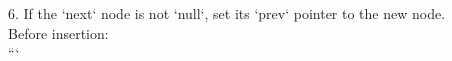 \documentclass[preview]{standalone}
\begin{document}
6. If the `next` node is not `null`, set its `prev` pointer to the new node.\\Before insertion:\\```\\
\end{document}
